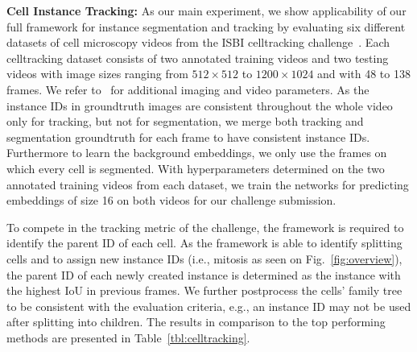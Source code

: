 \documentclass[runningheads,a4paper]{llncs}
\begin{document}
\noindent\textbf{Cell Instance Tracking:}
As our main experiment, we show applicability of our full framework for instance segmentation and tracking by evaluating six different datasets of cell microscopy videos from the ISBI celltracking challenge~\cite{Ulman2017}.
Each celltracking dataset consists of two annotated training videos and two testing videos with image sizes ranging from $512\times512$ to $1200\times1024$ and with 48 to 138 frames.
We refer to~\cite{Maska2014} for additional imaging and video parameters.
As the instance IDs in groundtruth images are consistent throughout the whole video only for tracking, but not for segmentation, we merge both tracking and segmentation groundtruth for each frame to have consistent instance IDs.
Furthermore to learn the background embeddings, we only use the frames on which every cell is segmented.
With hyperparameters determined on the two annotated training videos from each dataset, we train the networks for predicting embeddings of size 16 on both videos for our challenge submission.

To compete in the tracking metric of the challenge, the framework is required to identify the parent ID of each cell.
As the framework is able to identify splitting cells and to assign new instance IDs (i.e., mitosis as seen on Fig.~\ref{fig:overview}), the parent ID of each newly created instance is determined as the instance with the highest IoU in previous frames.
We further postprocess the cells' family tree to be consistent with the evaluation criteria, e.g., an instance ID may not be used after splitting into children.
The results in comparison to the top performing methods are presented in Table~\ref{tbl:celltracking}.





\end{document}
